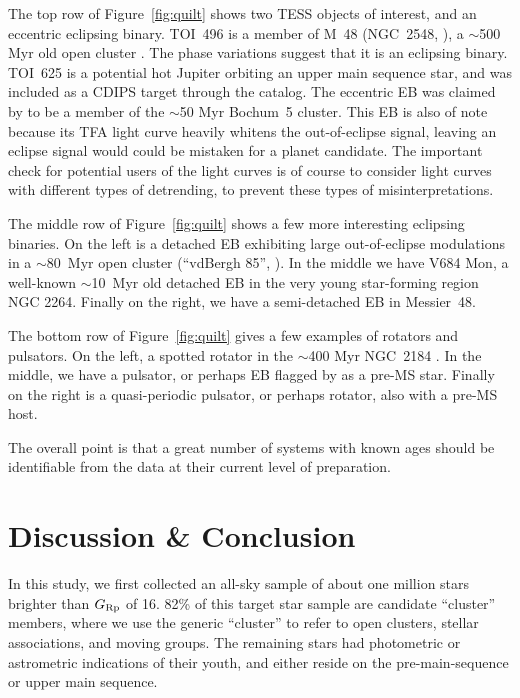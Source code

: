 \documentclass[12pt,twocolumn,tighten]{aastex62}
\begin{document}
The top row of Figure~\ref{fig:quilt} shows two TESS objects of
interest, and an eccentric eclipsing binary.  TOI~496 is a member of M~48 
(NGC~2548,
\citealt{gaia_collaboration_gaia_2018,cantat-gaudin_gaia_2018}), a
$\sim$500 Myr old open cluster \citep{Kharchenko_et_al_2013}.  The
phase variations suggest that it is an eclipsing binary.  TOI~625 is a
potential hot Jupiter orbiting an upper main sequence star, and was
included as a CDIPS target through the \citet{zari_3d_2018}
catalog.  The eccentric EB was claimed by \citet{dias_proper_2014} to
be a member of the $\sim$50 Myr Bochum~5 cluster.  This EB is also of
note because its TFA light curve heavily whitens the out-of-eclipse
signal, leaving an eclipse signal would could be mistaken for a planet 
candidate.  The important
check for potential users of the light curves is of course to consider
light curves with different types of detrending, to prevent these types of
misinterpretations.

The middle row of Figure~\ref{fig:quilt} shows a few more interesting
eclipsing binaries.  On the left is a detached EB exhibiting large
out-of-eclipse modulations in a $\sim$80~Myr
open cluster (``vdBergh 85'', \citealt{Kharchenko_et_al_2013}).
In the middle we have V684 Mon, a well-known $\sim$10~Myr old
detached EB in the very young star-forming region NGC 2264.
Finally on the right, we have a semi-detached EB in Messier~48.

The bottom row of Figure~\ref{fig:quilt} gives a few examples
of rotators and pulsators.  On the left, a spotted rotator in the
$\sim$400 Myr NGC~2184 \citep{cantat-gaudin_gaia_2018}.
In the middle, we have a pulsator, or perhaps EB flagged by
\citet{zari_3d_2018} as a pre-MS star.
Finally on the right is a quasi-periodic pulsator, or perhaps rotator,
also with a pre-MS host.

The overall point is that a great number of systems with known ages
should be identifiable from the data at their current level of
preparation.


\section{Discussion \& Conclusion}
\label{sec:conclusion}

In this study, we first collected an all-sky sample of about one
million stars brighter than $G_{\rm Rp}$ of 16.  82\%
of this target star sample are candidate ``cluster'' members, 
where we use the generic ``cluster'' to refer to 
open clusters, stellar associations, and moving groups.
The remaining stars had photometric or astrometric indications of
their youth, and either reside on the pre-main-sequence or upper main
sequence.
\end{document}
